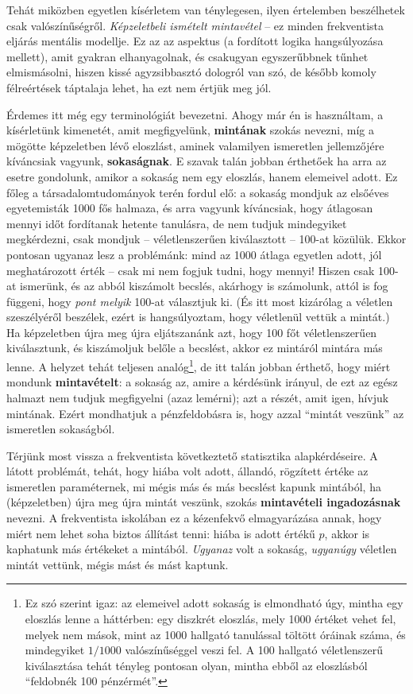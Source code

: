 \documentclass[magyar,]{book}
\let\rmarkdownfootnote\footnote%
\def\footnote{\protect\rmarkdownfootnote}
\begin{document}
Tehát miközben egyetlen kísérletem van ténylegesen, ilyen értelemben beszélhetek csak valószínűségről. \emph{Képzeletbeli ismételt mintavétel} -- ez minden frekventista eljárás mentális modellje. Ez az az aspektus (a fordított logika hangsúlyozása mellett), amit gyakran elhanyagolnak, és csakugyan egyszerűbbnek tűnhet elmismásolni, hiszen kissé agyzsibbasztó dologról van szó, de később komoly félreértések táptalaja lehet, ha ezt nem értjük meg jól.

Érdemes itt még egy terminológiát bevezetni. Ahogy már én is használtam, a kísérletünk kimenetét, amit megfigyelünk, \textbf{mintának} szokás nevezni, míg a mögötte képzeletben lévő eloszlást, aminek valamilyen ismeretlen jellemzőjére kíváncsiak vagyunk, \textbf{sokaságnak}. E szavak talán jobban érthetőek ha arra az esetre gondolunk, amikor a sokaság nem egy eloszlás, hanem elemeivel adott. Ez főleg a társadalomtudományok terén fordul elő: a sokaság mondjuk az elsőéves egyetemisták 1000 fős halmaza, és arra vagyunk kíváncsiak, hogy átlagosan mennyi időt fordítanak hetente tanulásra, de nem tudjuk mindegyiket megkérdezni, csak mondjuk -- véletlenszerűen kiválasztott -- 100-at közülük. Ekkor pontosan ugyanaz lesz a problémánk: mind az 1000 átlaga egyetlen adott, jól meghatározott érték -- csak mi nem fogjuk tudni, hogy mennyi! Hiszen csak 100-at ismerünk, és az abból kiszámolt becslés, akárhogy is számolunk, attól is fog függeni, hogy \emph{pont melyik} 100-at választjuk ki. (És itt most kizárólag a véletlen szeszélyéről beszélek, ezért is hangsúlyoztam, hogy véletlenül vettük a mintát.) Ha képzeletben újra meg újra eljátszanánk azt, hogy 100 főt véletlenszerűen kiválasztunk, és kiszámoljuk belőle a becslést, akkor ez mintáról mintára más lenne. A helyzet tehát teljesen analóg\footnote{Ez szó szerint igaz: az elemeivel adott sokaság is elmondható úgy, mintha egy eloszlás lenne a háttérben: egy diszkrét eloszlás, mely 1000 értéket vehet fel, melyek nem mások, mint az 1000 hallgató tanulással töltött óráinak száma, és mindegyiket \(1/1000\) valószínűséggel veszi fel. A 100 hallgató véletlenszerű kiválasztása tehát tényleg pontosan olyan, mintha ebből az eloszlásból \enquote{feldobnék 100 pénzérmét}.}, de itt talán jobban érthető, hogy miért mondunk \textbf{mintavételt}: a sokaság az, amire a kérdésünk irányul, de ezt az egész halmazt nem tudjuk megfigyelni (azaz lemérni); azt a részét, amit igen, hívjuk mintának. Ezért mondhatjuk a pénzfeldobásra is, hogy azzal \enquote{mintát veszünk} az ismeretlen sokaságból.

Térjünk most vissza a frekventista következtető statisztika alapkérdéseire. A látott problémát, tehát, hogy hiába volt adott, állandó, rögzített értéke az ismeretlen paraméternek, mi mégis más és más becslést kapunk mintából, ha (képzeletben) újra meg újra mintát veszünk, szokás \textbf{mintavételi ingadozásnak} nevezni. A frekventista iskolában ez a kézenfekvő elmagyarázása annak, hogy miért nem lehet soha biztos állítást tenni: hiába is adott értékű \(p\), akkor is kaphatunk más értékeket a mintából. \emph{Ugyanaz} volt a sokaság, \emph{ugyanúgy} véletlen mintát vettünk, mégis mást és mást kaptunk.
\end{document}
